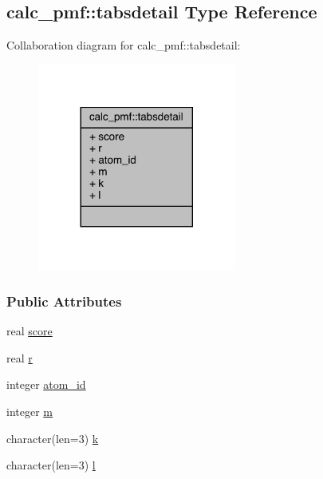 \hypertarget{structcalc__pmf_1_1tabsdetail}{\subsection{calc\-\_\-pmf\-:\-:tabsdetail Type Reference}
\label{structcalc__pmf_1_1tabsdetail}
}


Collaboration diagram for calc\-\_\-pmf\-:\-:tabsdetail\-:
\nopagebreak
\begin{figure}[H]
\begin{center}
\leavevmode
\includegraphics[width=185pt]{structcalc__pmf_1_1tabsdetail__coll__graph}
\end{center}
\end{figure}
\subsubsection*{Public Attributes}
\begin{DoxyCompactItemize}
\item 
real \hyperlink{structcalc__pmf_1_1tabsdetail_a1e4395c9e5fa17026c93e0c186a64525}{score}
\item 
real \hyperlink{structcalc__pmf_1_1tabsdetail_a029eaf86b3a411548dba509a47811640}{r}
\item 
integer \hyperlink{structcalc__pmf_1_1tabsdetail_a40cc10447ed88b5a828d9611bab16b37}{atom\-\_\-id}
\item 
integer \hyperlink{structcalc__pmf_1_1tabsdetail_a1121f13bbe31eafc5514fb22a8385790}{m}
\item 
character(len=3) \hyperlink{structcalc__pmf_1_1tabsdetail_a83bcadffd205728a4a1a49df0fa85ef0}{k}
\item 
character(len=3) \hyperlink{structcalc__pmf_1_1tabsdetail_a470b6b66bc1e9c337de474165f50bd1b}{l}
\end{DoxyCompactItemize}


